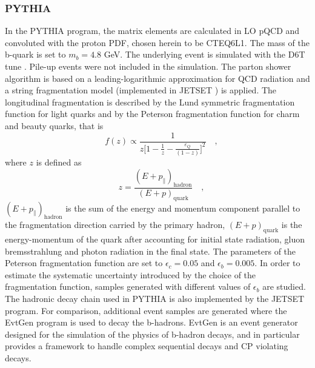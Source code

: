 \subsubsection{PYTHIA}
In the PYTHIA program, the matrix elements are calculated in LO pQCD and
convoluted with the proton PDF, chosen herein to be CTEQ6L1. The mass of
the b-quark is set to $m_b=4.8$ GeV. The underlying event is simulated with the
D6T tune%
. Pile-up events were not included in the simulation. The parton
shower algorithm is based on a leading-logarithmic approximation for QCD radiation 
and a string fragmentation model (implemented in JETSET%
) is applied.
The longitudinal fragmentation is described by the Lund symmetric fragmentation 
function%
 for light quarks and by the Peterson fragmentation function for
charm and beauty quarks, that is
\begin{displaymath}\quad
f(z)\propto\frac{1}{z\Big[1-\frac{1}{z}-\frac{\varepsilon_Q}{(1-z)}\Big]^2} \quad,
\end{displaymath}
where $z$ is defined as
\begin{displaymath}\quad
z=\frac{(E+p_\parallel)_\mathrm{hadron}}{(E+p)_\mathrm{quark}} \quad,
\end{displaymath}
$(E+p_\parallel)_\mathrm{hadron}$ is the sum of the energy and momentum component parallel to the fragmentation direction carried by the primary hadron, $(E+p)_\mathrm{quark}$ is the energy-momentum of the quark after accounting for initial state radiation, gluon bremsstrahlung and photon radiation in the final state. The parameters of the Peterson fragmentation function
are set to $\epsilon_c=0.05$ and $\epsilon_b=0.005$. In order to estimate the systematic uncertainty 
introduced by the choice of the fragmentation function, samples generated
with different values of $\epsilon_b$ are studied. The hadronic decay chain used in PYTHIA
is also implemented by the JETSET program. For comparison, additional event
samples are generated where the EvtGen program is used to decay the b-hadrons. 
EvtGen is an event generator designed for the simulation of the physics
of b-hadron decays, and in particular provides a framework to handle complex
sequential decays and CP violating decays.

